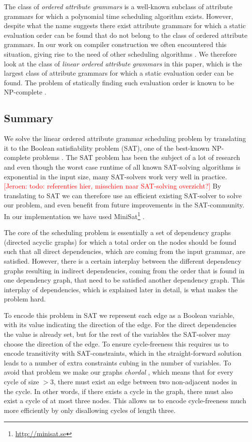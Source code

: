 \documentclass{llncs}
\newif\iffinal\finalfalse
\newcommand{\REM}[3]{\iffinal\else\textcolor{#2}{[#1: #3]}\fi}
\newcommand{\Jeroen}[1]{\REM{Jeroen}{red}{#1}}
\begin{document}
The class of \emph{ordered attribute grammars} \cite{kastens80} is a well-known subclass of attribute grammars for which a polynomial time scheduling algorithm exists. However, despite what the name suggests there exist attribute grammars for which a static evaluation order can be found that do not belong to the class of ordered attribute grammars. In our work on compiler construction we often encountered this situation, giving rise to the need of other scheduling algorithms \cite{bransen2012,Binsbergen:2015}. We therefore look at the class of \emph{linear ordered attribute grammars} in this paper, which is the largest class of attribute grammars for which a static evaluation order can be found. The problem of statically finding such evaluation order is known to be NP-complete \cite{engelfriet82}.

\subsection{Summary}
We solve the linear ordered attribute grammar scheduling problem by translating it to the Boolean satisfiability problem (SAT), one of the best-known NP-complete problems \cite{Cook:1971}. The SAT problem has been the subject of a lot of research and even though the worst case runtime of all known SAT-solving algorithms is exponential in the input size, many SAT-solvers work very well in practice. \Jeroen{todo: referenties hier, misschien naar SAT-solving overzicht?} By translating to SAT we can therefore use an efficient existing SAT-solver to solve our problem, and even benefit from future improvements in the SAT-community. In our implementation we have used MiniSat\footnote{\url{http://minisat.se}} \cite{Een:2004}.

The core of the scheduling problem is essentially a set of dependency graphs (directed acyclic graphs) for which a total order on the nodes should be found such that all direct dependencies, which are coming from the input grammar, are satisfied. However, there is a certain interplay between the different dependency graphs resulting in indirect dependencies, coming from the order that is found in one dependency graph, that need to be satisfied another dependency graph. This interplay of dependencies, which is explained later in detail, is what makes the problem hard.

To encode this problem in SAT we represent each edge as a Boolean variable, with its value indicating the direction of the edge. For the direct dependencies the value is already set, but for the rest of the variables the SAT-solver may choose the direction of the edge. To ensure cycle-freeness this requires us to encode transitivity with SAT-constraints, which in the straight-forward solution leads to a number of extra constraints cubing in the number of variables. To avoid that problem we make our graphs \emph{chordal} \cite{Dirac:1961}, which means that for every cycle of size $> 3$, there must exist an edge between two non-adjacent nodes in the cycle. In other words, if there exists a cycle in the graph, there must also exist a cycle of at most three nodes. This allows us to encode cycle-freeness much more efficiently by only disallowing cycles of length three.
\end{document}
